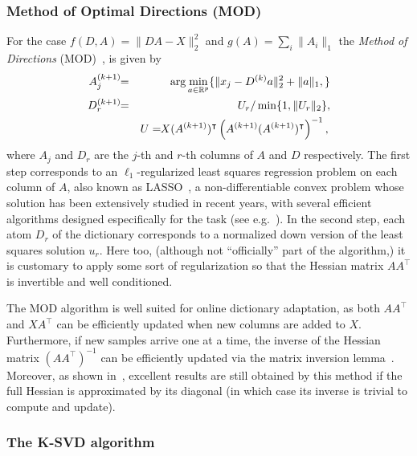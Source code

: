 \documentclass[twocolumn]{IEEEtran}
\theoremstyle{definition}
\def\transp{^\intercal}
\def\reals{\ensuremath{\mathbb{R}}}
\begin{document}
\subsubsection{Method of Optimal Directions (MOD)} 
\label{sec:mod}
For the case $f(D,A)=\|DA-X\|_2^2$ and $g(A)=\sum_{i}\|A_i\|_1$ the \emph{Method of Directions} (MOD)~\cite{mod}, is given by
\begin{eqnarray}
A_j\iter{k+1}\!\! &=&\!\! \arg\min_{a \in \reals^p} \{ \|x_j - D\iter{k}a \|_2^2 + \|a\|_1, \} \\
D_r\iter{k+1}\!\! &=&\!\! U_r/\min\{1,\|U_r\|_2\},\nonumber\\
\!\!&&U=\!\!X(A\iter{k+1})\transp\left(A\iter{k+1}({A}\iter{k+1})\transp\right)^{-1},\,
\label{eq:mod}
\end{eqnarray}
where $A_j$ and $D_r$ are the $j$-th and $r$-th columns of $A$ and $D$ respectively. The first step corresponds to an $\ell_1$-regularized least squares regression problem on each column of $A$, also known as LASSO~\cite{lasso}, a non-differentiable convex problem whose solution has been extensively studied in recent years, with several efficient algorithms designed especifically for the task (see e.g.~\cite{fista}).
In the second step, each atom $D_r$ of the dictionary corresponds to a normalized down version of the least squares solution $u_r$. Here too, (although not ``officially'' part of the algorithm,) it is customary  to apply some sort of regularization so that the Hessian matrix $AA\transp$ is invertible and well conditioned.

The MOD algorithm is well suited for online dictionary adaptation, as both  $A{A}\transp$ and $XA\transp$ can be efficiently updated when new columns are added to $X$. Furthermore, if new samples arrive one at a time, the inverse of the Hessian matrix $({A}A\transp)^{-1}$ can be efficiently updated via the matrix inversion lemma~\cite{matrix-inv-lemma}. Moreover, as shown in~\cite{online-dl}, excellent results are still obtained by this method if the full Hessian is approximated by its diagonal (in which case its inverse is trivial to compute and update).

\subsubsection{The K-SVD algorithm} 
\label{sec:ksvd}
\end{document}
